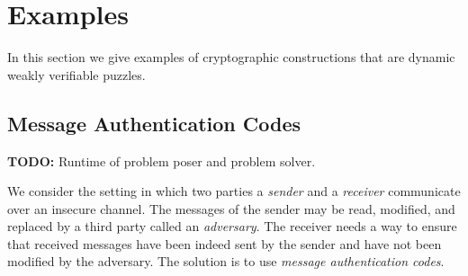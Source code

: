\section{Examples}
\label{section:wvp_examples}
In this section we give examples of cryptographic constructions that are dynamic weakly verifiable puzzles.

\subsection{Message Authentication Codes}
\begin{todo}
  \textbf{TODO:} Runtime of problem poser and problem solver.
\end{todo}
We consider the setting in which two parties a \textit{sender} and a \textit{receiver} communicate over an insecure channel.
The messages of the sender may be read, modified, and replaced by a third party called an \textit{adversary}.
The receiver needs a way to ensure that received messages have been indeed sent by the sender and have not been modified by the adversary.
The solution is to use \textit{message authentication codes}.

